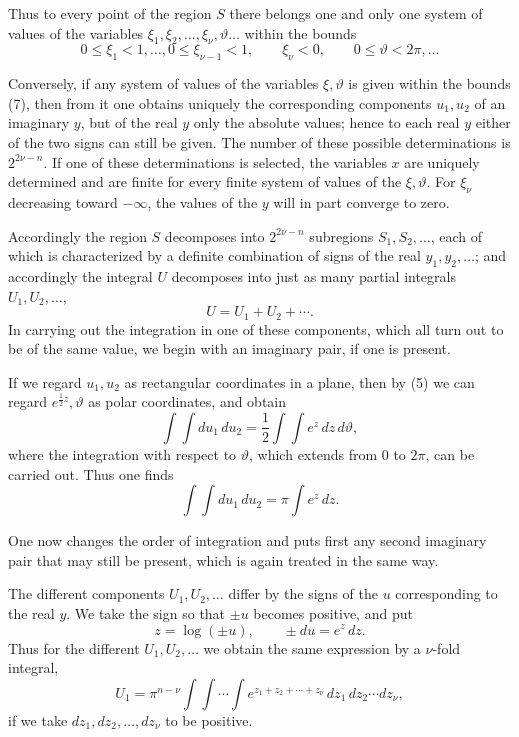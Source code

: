 \documentclass[11pt]{article}
\begin{document}
Thus to every point of the region $S$ there belongs one and only one system of values of the variables $\xi_1,\xi_2,\ldots,\xi_\nu,\vartheta\ldots$ within the bounds
\begin{equation}
0\leq\xi_1<1,\ldots,
0\leq\xi_{\nu-1}<1,
\qquad
\xi_\nu<0,
\qquad
0\leq\vartheta<2\pi,\ldots
\tag{7}
\end{equation}

Conversely, if any system of values of the variables $\xi,\vartheta$ is given within the bounds (7), then from it one obtains uniquely the corresponding components $u_1,u_2$ of an imaginary $y$, but of the real $y$ only the absolute values; hence to each real $y$ either of the two signs can still be given. The number of these possible determinations is $2^{2\nu-n}$. If one of these determinations is selected, the variables $x$ are uniquely determined and are finite for every finite system of values of the $\xi,\vartheta$. For $\xi_\nu$ decreasing toward $-\infty$, the values of the $y$ will in part converge to zero.

Accordingly the region $S$ decomposes into $2^{2\nu-n}$ subregions $S_1,S_2,\ldots$, each of which is characterized by a definite combination of signs of the real $y_1,y_2,\ldots$; and accordingly the integral $U$ decomposes into just as many partial integrals $U_1,U_2,\ldots$,
\[
U=U_1+U_2+\cdots.
\]
In carrying out the integration in one of these components, which all turn out to be of the same value, we begin with an imaginary pair, if one is present.

If we regard $u_1,u_2$ as rectangular coordinates in a plane, then by (5) we can regard $e^{\frac12 z},\vartheta$ as polar coordinates, and obtain
\[
\int\!\int du_1\,du_2=\frac12\int\!\int e^z\,dz\,d\vartheta,
\]
where the integration with respect to $\vartheta$, which extends from 0 to $2\pi$, can be carried out. Thus one finds
\[
\int\!\int du_1\,du_2=\pi\int e^z\,dz.
\]

One now changes the order of integration and puts first any second imaginary pair that may still be present, which is again treated in the same way.

The different components $U_1,U_2,\ldots$ differ by the signs of the $u$ corresponding to the real $y$. We take the sign so that $\pm u$ becomes positive, and put
\begin{equation}
z=\log(\pm u),
\qquad \pm du=e^z\,dz.
\tag{8}
\end{equation}
Thus for the different $U_1,U_2,\ldots$ we obtain the same expression by a $\nu$-fold integral,
\begin{equation}
U_1=\pi^{n-\nu}\int\!\int\cdots\int e^{z_1+z_2+\cdots+z_\nu}\,dz_1\,dz_2\cdots dz_\nu,
\tag{9}
\end{equation}
if we take $dz_1,dz_2,\ldots,dz_\nu$ to be positive.
\end{document}
